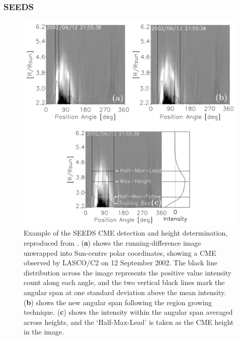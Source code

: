 \documentclass[namedreferences]{SolarPhysics}
\begin{document}
\begin{article}
\subsubsection{SEEDS}

\begin{figure}[!ht]
\centerline{\includegraphics[scale=0.45, clip=true, trim=0 0 0 0]{images/SEEDS.pdf}}
\caption{Example of the SEEDS CME detection and height determination, reproduced from \citet{2008SoPh..248..485O}. ({\bf a}) shows the running-difference image unwrapped into Sun-centre polar coordinates, showing a CME observed by LASCO/C2 on 12 September 2002. The black line distribution across the image represents the positive value intensity count along each angle, and the two vertical black lines mark the angular span at one standard deviation above the mean intensity. ({\bf b}) shows the new angular span following the region growing technique. ({\bf c}) shows the intensity within the angular span averaged across heights, and the `Half-Max-Lead' is taken as the CME height in the image.}
\label{seeds}
\end{figure}


\end{article}
\end{document}
